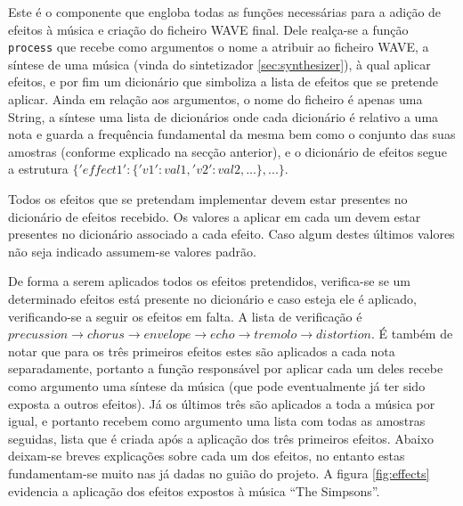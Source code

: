 \documentclass[a4paper,11pt,openright,oneside]{report}
\begin{document}
Este é o componente que engloba todas as funções necessárias para a adição de efeitos à música e criação do ficheiro WAVE final. Dele realça-se a função \verb|process| que recebe como argumentos o nome a atribuir ao ficheiro WAVE, a síntese de uma música (vinda do sintetizador \ref{sec:synthesizer}), à qual aplicar efeitos, e por fim um dicionário que simboliza a lista de efeitos que se pretende aplicar. Ainda em relação aos argumentos, o nome do ficheiro é apenas uma String, a síntese uma lista de dicionários onde cada dicionário é relativo a uma nota e guarda a frequência fundamental da mesma bem como o conjunto das suas amostras (conforme explicado na secção anterior), e o dicionário de efeitos segue a estrutura $\{'effect1': \{'v1': val1, 'v2': val2, ...\}, ...\}$.

Todos os efeitos que se pretendam implementar devem estar presentes no dicionário de efeitos recebido. Os valores a aplicar em cada um devem estar presentes no dicionário associado a cada efeito. Caso algum destes últimos valores não seja indicado assumem-se valores padrão.

De forma a serem aplicados todos os efeitos pretendidos, verifica-se se um determinado efeitos está presente no dicionário e caso esteja ele é aplicado, verificando-se a seguir os efeitos em falta. A lista de verificação é $precussion \rightarrow chorus \rightarrow envelope \rightarrow echo \rightarrow tremolo \rightarrow distortion$. É também de notar que para os três primeiros efeitos estes são aplicados a cada nota separadamente, portanto a função responsável por aplicar cada um deles recebe como argumento uma síntese da música (que pode eventualmente já ter sido exposta a outros efeitos). Já os últimos três são aplicados a toda a música por igual, e portanto recebem como argumento uma lista com todas as amostras seguidas, lista que é criada após a aplicação dos três primeiros efeitos. Abaixo deixam-se breves explicações sobre cada um dos efeitos, no entanto estas fundamentam-se muito nas já dadas no guião do projeto. A figura \ref{fig:effects} evidencia a aplicação dos efeitos expostos à música ``The Simpsons''.
\end{document}
